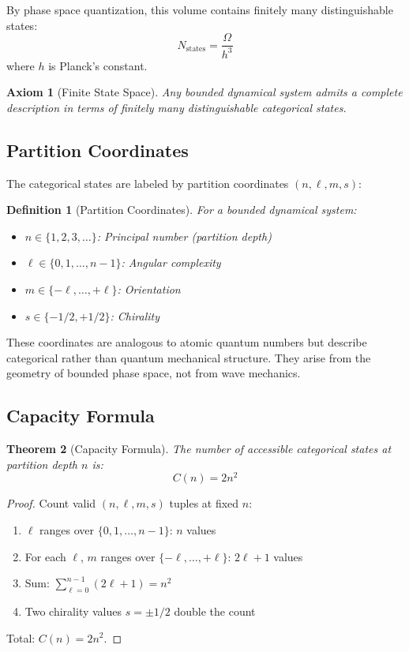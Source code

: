 \documentclass[twocolumn,10pt]{article}
\newtheorem{theorem}{Theorem}[section]
\newtheorem{definition}[theorem]{Definition}
\newtheorem{axiom}{Axiom}
\begin{document}
By phase space quantization, this volume contains finitely many distinguishable states:
\begin{equation}
    N_{\text{states}} = \frac{\Omega}{h^3}
\end{equation}
where $h$ is Planck's constant.

\begin{axiom}[Finite State Space]
\label{axiom:finite}
Any bounded dynamical system admits a complete description in terms of finitely many distinguishable categorical states.
\end{axiom}

\subsection{Partition Coordinates}

The categorical states are labeled by partition coordinates $(n, \ell, m, s)$:

\begin{definition}[Partition Coordinates]
\label{def:partition}
For a bounded dynamical system:
\begin{itemize}
    \item $n \in \{1, 2, 3, \ldots\}$: Principal number (partition depth)
    \item $\ell \in \{0, 1, \ldots, n-1\}$: Angular complexity
    \item $m \in \{-\ell, \ldots, +\ell\}$: Orientation
    \item $s \in \{-1/2, +1/2\}$: Chirality
\end{itemize}
\end{definition}

These coordinates are analogous to atomic quantum numbers but describe categorical rather than quantum mechanical structure. They arise from the geometry of bounded phase space, not from wave mechanics.

\subsection{Capacity Formula}

\begin{theorem}[Capacity Formula]
\label{thm:capacity}
The number of accessible categorical states at partition depth $n$ is:
\begin{equation}
    C(n) = 2n^2
\end{equation}
\end{theorem}

\begin{proof}
Count valid $(n, \ell, m, s)$ tuples at fixed $n$:
\begin{enumerate}
    \item $\ell$ ranges over $\{0, 1, \ldots, n-1\}$: $n$ values
    \item For each $\ell$, $m$ ranges over $\{-\ell, \ldots, +\ell\}$: $2\ell + 1$ values
    \item Sum: $\sum_{\ell=0}^{n-1}(2\ell + 1) = n^2$
    \item Two chirality values $s = \pm 1/2$ double the count
\end{enumerate}
Total: $C(n) = 2n^2$.
\end{proof}
\end{document}
